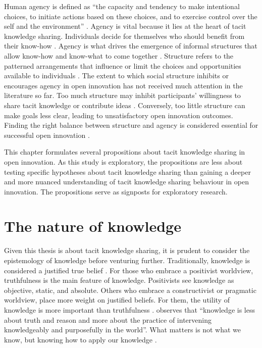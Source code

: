 Human agency is defined as \enquote{the capacity and tendency to make intentional choices, to initiate actions based on these choices, and to exercise control over the self and the environment} \citep[][pg.~88]{goller2017human}. Agency is vital because it lies at the heart of tacit knowledge sharing. Individuals decide for themselves who should benefit from their know-how \citep{polanyi1966tacit}. Agency is what drives the emergence of informal structures that allow know-how and know-what to come together \citep{lam2014tacit, hubrich2015embodiment}. Structure refers to the patterned arrangements that influence or limit the choices and opportunities available to individuals \citep{bandura1999social}. The extent to which social structure inhibits or encourages agency in open innovation has not received much attention in the literature so far. Too much structure may inhibit participants' willingness to share tacit knowledge or contribute ideas \citep{lam2000tacit}. Conversely, too little structure can make goals less clear, leading to unsatisfactory open innovation outcomes. Finding the right balance between structure and agency is considered essential for successful open innovation \citep{davis2010agency}. \medskip

This chapter formulates several propositions about tacit knowledge sharing in open innovation. As this study is exploratory, the propositions are less about testing specific hypotheses about tacit knowledge sharing than gaining a deeper and more nuanced understanding of tacit knowledge sharing behaviour in open innovation. The propositions serve as signposts for exploratory research.

\section{The nature of knowledge}

Given this thesis is about tacit knowledge sharing, it is prudent to consider the epistemology of knowledge before venturing further. Traditionally, knowledge is considered a justified true belief \citep{bolisani2018elusive}. For those who embrace a positivist worldview, truthfulness is the main feature of knowledge. Positivists see knowledge as objective, static, and absolute. Others who embrace a constructivist or pragmatic worldview, place more weight on justified beliefs. For them, the utility of knowledge is more important than truthfulness \citep{bolisani2018elusive}. \citet{spender1996organizational} observes that \enquote{knowledge is less about truth and reason and more about the practice of intervening knowledgeably and purposefully in the world}. What matters is not what we know, but knowing how to apply our knowledge \citep{ryle2009concept,orlikowski2002knowing}. \medskip

